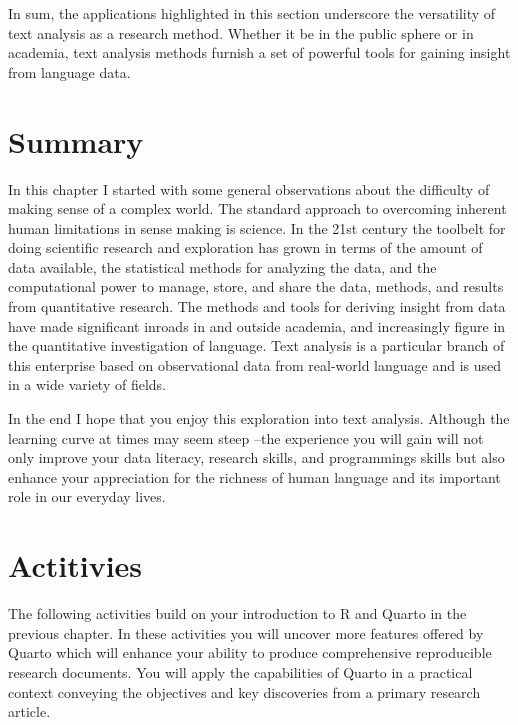 \documentclass[
  letterpaper,
  DIV=11,
  numbers=noendperiod]{scrreport}
\theoremstyle{definition}
\theoremstyle{remark}
\begin{document}
In sum, the applications highlighted in this section underscore the
versatility of text analysis as a research method. Whether it be in the
public sphere or in academia, text analysis methods furnish a set of
powerful tools for gaining insight from language data.

\hypertarget{summary}{%
\section*{Summary}\label{summary}}


In this chapter I started with some general observations about the
difficulty of making sense of a complex world. The standard approach to
overcoming inherent human limitations in sense making is science. In the
21st century the toolbelt for doing scientific research and exploration
has grown in terms of the amount of data available, the statistical
methods for analyzing the data, and the computational power to manage,
store, and share the data, methods, and results from quantitative
research. The methods and tools for deriving insight from data have made
significant inroads in and outside academia, and increasingly figure in
the quantitative investigation of language. Text analysis is a
particular branch of this enterprise based on observational data from
real-world language and is used in a wide variety of fields.

In the end I hope that you enjoy this exploration into text analysis.
Although the learning curve at times may seem steep --the experience you
will gain will not only improve your data literacy, research skills, and
programmings skills but also enhance your appreciation for the richness
of human language and its important role in our everyday lives.

\hypertarget{actitivies}{%
\section*{Actitivies}\label{actitivies}}


The following activities build on your introduction to R and Quarto in
the previous chapter. In these activities you will uncover more features
offered by Quarto which will enhance your ability to produce
comprehensive reproducible research documents. You will apply the
capabilities of Quarto in a practical context conveying the objectives
and key discoveries from a primary research article.
\end{document}

